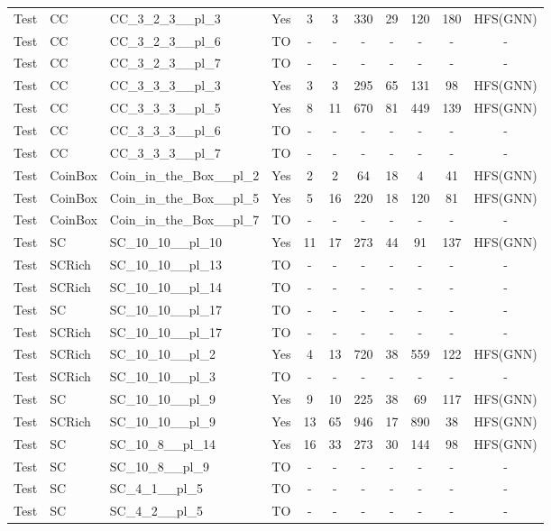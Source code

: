\documentclass{article}
\begin{document}
\begin{tabular}{lllcccccccc}
Test & CC & CC\_3\_2\_3\_\_pl\_3 & Yes & 3 & 3 & 330 & 29 & 120 & 180 & HFS(GNN) \\
Test & CC & CC\_3\_2\_3\_\_pl\_6 & TO & - & - & - & - & - & - & - \\
Test & CC & CC\_3\_2\_3\_\_pl\_7 & TO & - & - & - & - & - & - & - \\
Test & CC & CC\_3\_3\_3\_\_pl\_3 & Yes & 3 & 3 & 295 & 65 & 131 & 98 & HFS(GNN) \\
Test & CC & CC\_3\_3\_3\_\_pl\_5 & Yes & 8 & 11 & 670 & 81 & 449 & 139 & HFS(GNN) \\
Test & CC & CC\_3\_3\_3\_\_pl\_6 & TO & - & - & - & - & - & - & - \\
Test & CC & CC\_3\_3\_3\_\_pl\_7 & TO & - & - & - & - & - & - & - \\
Test & CoinBox & Coin\_in\_the\_Box\_\_pl\_2 & Yes & 2 & 2 & 64 & 18 & 4 & 41 & HFS(GNN) \\
Test & CoinBox & Coin\_in\_the\_Box\_\_pl\_5 & Yes & 5 & 16 & 220 & 18 & 120 & 81 & HFS(GNN) \\
Test & CoinBox & Coin\_in\_the\_Box\_\_pl\_7 & TO & - & - & - & - & - & - & - \\
Test & SC & SC\_10\_10\_\_pl\_10 & Yes & 11 & 17 & 273 & 44 & 91 & 137 & HFS(GNN) \\
Test & SCRich & SC\_10\_10\_\_pl\_13 & TO & - & - & - & - & - & - & - \\
Test & SCRich & SC\_10\_10\_\_pl\_14 & TO & - & - & - & - & - & - & - \\
Test & SC & SC\_10\_10\_\_pl\_17 & TO & - & - & - & - & - & - & - \\
Test & SCRich & SC\_10\_10\_\_pl\_17 & TO & - & - & - & - & - & - & - \\
Test & SCRich & SC\_10\_10\_\_pl\_2 & Yes & 4 & 13 & 720 & 38 & 559 & 122 & HFS(GNN) \\
Test & SCRich & SC\_10\_10\_\_pl\_3 & TO & - & - & - & - & - & - & - \\
Test & SC & SC\_10\_10\_\_pl\_9 & Yes & 9 & 10 & 225 & 38 & 69 & 117 & HFS(GNN) \\
Test & SCRich & SC\_10\_10\_\_pl\_9 & Yes & 13 & 65 & 946 & 17 & 890 & 38 & HFS(GNN) \\
Test & SC & SC\_10\_8\_\_pl\_14 & Yes & 16 & 33 & 273 & 30 & 144 & 98 & HFS(GNN) \\
Test & SC & SC\_10\_8\_\_pl\_9 & TO & - & - & - & - & - & - & - \\
Test & SC & SC\_4\_1\_\_pl\_5 & TO & - & - & - & - & - & - & - \\
Test & SC & SC\_4\_2\_\_pl\_5 & TO & - & - & - & - & - & - & - \\

\end{tabular}
\end{document}
